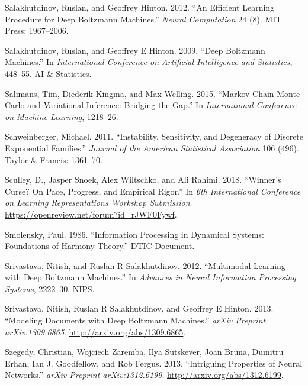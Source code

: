\documentclass[]{article}
\theoremstyle{definition}
\begin{document}
\leavevmode\hypertarget{ref-salakhutdinov2012efficient}{}%
Salakhutdinov, Ruslan, and Geoffrey Hinton. 2012. ``An Efficient
Learning Procedure for Deep Boltzmann Machines.'' \emph{Neural
Computation} 24 (8). MIT Press: 1967--2006.

\leavevmode\hypertarget{ref-salakhutdinov2009deep}{}%
Salakhutdinov, Ruslan, and Geoffrey E Hinton. 2009. ``Deep Boltzmann
Machines.'' In \emph{International Conference on Artificial Intelligence
and Statistics}, 448--55. AI \& Statistics.

\leavevmode\hypertarget{ref-salimans2015markov}{}%
Salimans, Tim, Diederik Kingma, and Max Welling. 2015. ``Markov Chain
Monte Carlo and Variational Inference: Bridging the Gap.'' In
\emph{International Conference on Machine Learning}, 1218--26.

\leavevmode\hypertarget{ref-schweinberger2011instability}{}%
Schweinberger, Michael. 2011. ``Instability, Sensitivity, and Degeneracy
of Discrete Exponential Families.'' \emph{Journal of the American
Statistical Association} 106 (496). Taylor \& Francis: 1361--70.

\leavevmode\hypertarget{ref-sculley2018winner}{}%
Sculley, D., Jasper Snoek, Alex Wiltschko, and Ali Rahimi. 2018.
``Winner's Curse? On Pace, Progress, and Empirical Rigor.'' In \emph{6th
International Conference on Learning Representations Workshop
Submission}. \url{https://openreview.net/forum?id=rJWF0Fywf}.

\leavevmode\hypertarget{ref-smolensky1986information}{}%
Smolensky, Paul. 1986. ``Information Processing in Dynamical Systems:
Foundations of Harmony Theory.'' DTIC Document.

\leavevmode\hypertarget{ref-srivastava2012multimodal}{}%
Srivastava, Nitish, and Ruslan R Salakhutdinov. 2012. ``Multimodal
Learning with Deep Boltzmann Machines.'' In \emph{Advances in Neural
Information Processing Systems}, 2222--30. NIPS.

\leavevmode\hypertarget{ref-srivastava2013modeling}{}%
Srivastava, Nitish, Ruslan R Salakhutdinov, and Geoffrey E Hinton. 2013.
``Modeling Documents with Deep Boltzmann Machines.'' \emph{arXiv
Preprint arXiv:1309.6865}. \url{http://arxiv.org/abs/1309.6865}.

\leavevmode\hypertarget{ref-szegedy2013intriguing}{}%
Szegedy, Christian, Wojciech Zaremba, Ilya Sutskever, Joan Bruna,
Dumitru Erhan, Ian J. Goodfellow, and Rob Fergus. 2013. ``Intriguing
Properties of Neural Networks.'' \emph{arXiv Preprint arXiv:1312.6199}.
\url{http://arxiv.org/abs/1312.6199}.
\end{document}
